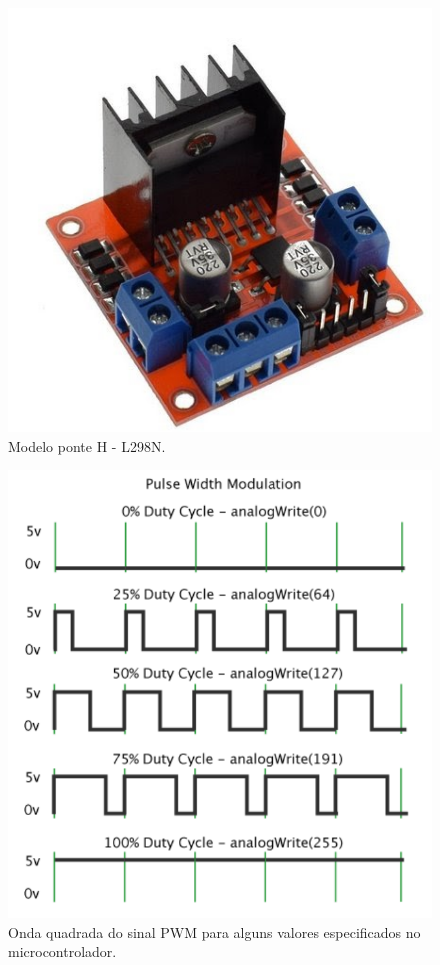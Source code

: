 \begin{figure}[H]
    \centering
    \includegraphics[scale=0.35]{figuras/implementacao/hardware/ponte_h.jpg}
    \caption{Modelo ponte H - L298N.}
    \label{fig:ponte_h}
\end{figure}

\begin{figure}[H]
    \centering
    \includegraphics[scale=0.30]{figuras/implementacao/hardware/pwm.png}
    \caption{Onda quadrada do sinal PWM para alguns valores especificados no microcontrolador.}
    \label{fig:pwm}
\end{figure}


